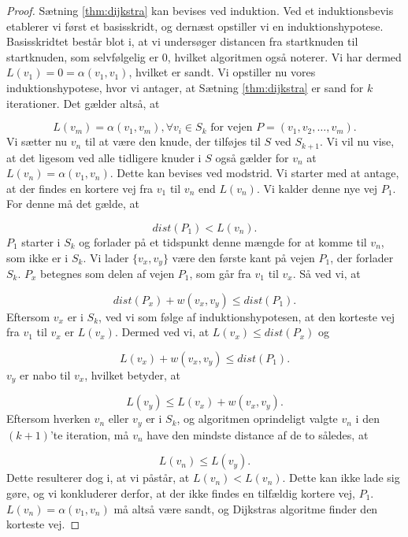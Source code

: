 \begin{proof}
Sætning \ref{thm:dijkstra} kan bevises ved induktion. Ved et induktionsbevis etablerer vi først et basisskridt, og dernæst opstiller vi en induktionshypotese. Basisskridtet består blot i, at vi undersøger distancen fra startknuden til startknuden, som selvfølgelig er 0, hvilket algoritmen også noterer. Vi har dermed $L(v_1)=0= \alpha(v_1,v_1)$, hvilket er sandt.
Vi opstiller nu vores induktionshypotese, hvor vi antager, at Sætning \ref{thm:dijkstra} er sand for $k$ iterationer. Det gælder altså, at

\begin{equation}
L(v_m) = \alpha(v_1,v_m), \forall v_i \in S_k \textrm{ for vejen } P = (v_1, v_2, \dotsc, v_m).
\end{equation}
Vi sætter nu $v_{n}$ til at være den knude, der tilføjes til $S$ ved $S_{k+1}$. Vi vil nu vise, at det ligesom ved alle tidligere knuder i $S$ også gælder for $v_{n}$ at $L(v_n)=\alpha(v_1,v_n)$. Dette kan bevises ved modstrid. Vi starter med at antage, at der findes en kortere vej fra $v_1$ til $v_n$ end $L(v_n)$. Vi kalder denne nye vej $P_1$. For denne må det gælde, at

\begin{equation}
dist(P_1)<L(v_n).
\end{equation}
$P_1$ starter i $S_k$ og forlader på et tidspunkt denne mængde for at komme til $v_n$, som ikke er i $S_k$. Vi lader $\{v_x,v_y\}$ være den første kant på vejen $P_1$, der forlader $S_k$. $P_x$ betegnes som delen af vejen $P_1$, som går fra $v_1$ til $v_x$. Så ved vi, at

\begin{equation}
dist(P_x)+w(v_x,v_y) \leq dist(P_1).
\end{equation}
Eftersom $v_x$ er i $S_k$, ved vi som følge af induktionshypotesen, at den korteste vej fra $v_1$ til $v_x$ er $L(v_x)$. Dermed ved vi, at $L(v_x) \leq dist(P_x)$ og

\begin{equation}
L(v_x) + w(v_x,v_y) \leq dist(P_1).
\end{equation}
$v_y$ er nabo til $v_x$, hvilket betyder, at

\begin{equation}
L(v_y) \leq L(v_x) + w(v_x,v_y).
\end{equation}
Eftersom hverken $v_n$ eller $v_y$ er i $S_k$, og algoritmen oprindeligt valgte $v_n$ i den $(k+1)$'te iteration, må $v_n$ have den mindste distance af de to således, at

\begin{equation}
L(v_n) \leq L(v_y).
\end{equation}
Dette resulterer dog i, at vi påstår, at $L(v_n) < L(v_n)$. Dette kan ikke lade sig gøre, og vi konkluderer derfor, at der ikke findes en tilfældig kortere vej, $P_1$. $L(v_n)=\alpha(v_1,v_n)$ må altså være sandt, og Dijkstras algoritme finder den korteste vej.
\end{proof}
